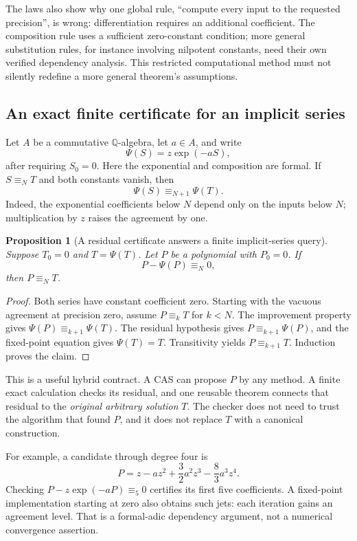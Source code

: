 \documentclass[11pt,a4paper]{article}
\newcommand{\Q}{\mathbb Q}
\newtheorem{proposition}{Proposition}[section]
\theoremstyle{definition}
\begin{document}
The laws also show why one global rule, ``compute every input to the requested precision'', is wrong: differentiation requires an additional coefficient. The composition rule uses a sufficient zero-constant condition; more general substitution rules, for instance involving nilpotent constants, need their own verified dependency analysis. This restricted computational method must not silently redefine a more general theorem's assumptions.

\subsection{An exact finite certificate for an implicit series}
Let \(A\) be a commutative \(\Q\)-algebra, let \(a\in A\), and write
\[
 \Psi(S)=z\exp(-aS),
\]
after requiring \(S_0=0\). Here the exponential and composition are formal. If \(S\equiv_N T\) and both constants vanish, then
\[
       \Psi(S)\equiv_{N+1}\Psi(T).
\]
Indeed, the exponential coefficients below \(N\) depend only on the inputs below \(N\); multiplication by \(z\) raises the agreement by one.

\begin{proposition}[A residual certificate answers a finite implicit-series query]\label{prop:residual}
Suppose \(T_0=0\) and \(T=\Psi(T)\). Let \(P\) be a polynomial with \(P_0=0\). If
\[
             P-\Psi(P)\equiv_N0,
\]
then \(P\equiv_N T\).
\end{proposition}
\begin{proof}
Both series have constant coefficient zero. Starting with the vacuous agreement at precision zero, assume \(P\equiv_kT\) for \(k<N\). The improvement property gives \(\Psi(P)\equiv_{k+1}\Psi(T)\). The residual hypothesis gives \(P\equiv_{k+1}\Psi(P)\), and the fixed-point equation gives \(\Psi(T)=T\). Transitivity yields \(P\equiv_{k+1}T\). Induction proves the claim.
\end{proof}

This is a useful hybrid contract. A CAS can propose \(P\) by any method. A finite exact calculation checks its residual, and one reusable theorem connects that residual to the \emph{original arbitrary solution} \(T\). The checker does not need to trust the algorithm that found \(P\), and it does not replace \(T\) with a canonical construction.

For example, a candidate through degree four is
\[
 P=z-az^2+\frac32a^2z^3-\frac83a^3z^4.
\]
Checking \(P-z\exp(-aP)\equiv_5 0\) certifies its first five coefficients. A fixed-point implementation starting at zero also obtains such jets: each iteration gains an agreement level. That is a formal-adic dependency argument, not a numerical convergence assertion.
\end{document}
